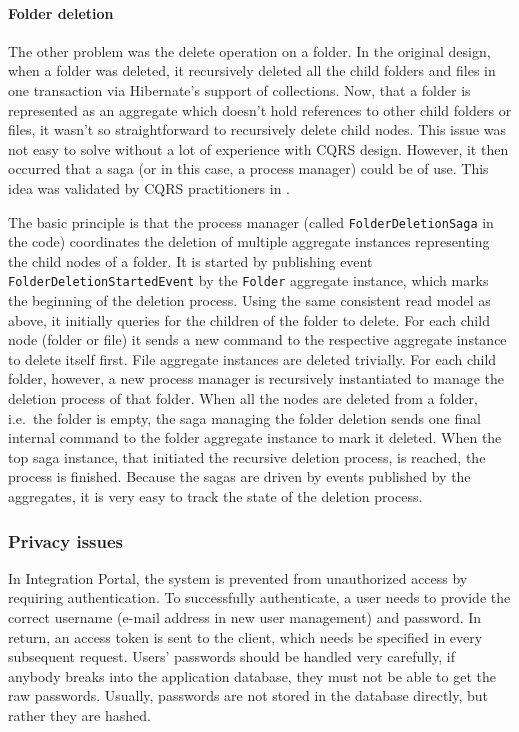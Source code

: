 \documentclass{book}
\begin{document}
\paragraph{Folder deletion}\label{folder-deletion}

The other problem was the delete operation on a folder. In the original
design, when a folder was deleted, it recursively deleted all the child
folders and files in one transaction via Hibernate's support of
collections. Now, that a folder is represented as an aggregate which
doesn't hold references to other child folders or files, it wasn't so
straightforward to recursively delete child nodes. This issue was not
easy to solve without a lot of experience with CQRS design. However, it
then occurred that a saga (or in this case, a process manager) could be
of use. This idea was validated by CQRS practitioners in
\cite{deleting}.

The basic principle is that the process manager (called
\texttt{FolderDeletionSaga} in the code) coordinates the deletion of
multiple aggregate instances representing the child nodes of a folder.
It is started by publishing event \texttt{FolderDeletionStartedEvent} by
the \texttt{Folder} aggregate instance, which marks the beginning of the
deletion process. Using the same consistent read model as above, it
initially queries for the children of the folder to delete. For each
child node (folder or file) it sends a new command to the respective
aggregate instance to delete itself first. File aggregate instances are
deleted trivially. For each child folder, however, a new process manager
is recursively instantiated to manage the deletion process of that
folder. When all the nodes are deleted from a folder, i.e.~the folder is
empty, the saga managing the folder deletion sends one final internal
command to the folder aggregate instance to mark it deleted. When the
top saga instance, that initiated the recursive deletion process, is
reached, the process is finished. Because the sagas are driven by events
published by the aggregates, it is very easy to track the state of the
deletion process.

\subsubsection{Privacy issues}\label{privacy-issues}

In Integration Portal, the system is prevented from unauthorized access
by requiring authentication. To successfully authenticate, a user needs
to provide the correct username (e-mail address in new user management)
and password. In return, an access token is sent to the client, which
needs be specified in every subsequent request. Users' passwords should
be handled very carefully, if anybody breaks into the application
database, they must not be able to get the raw passwords. Usually,
passwords are not stored in the database directly, but rather they are
hashed.
\end{document}

